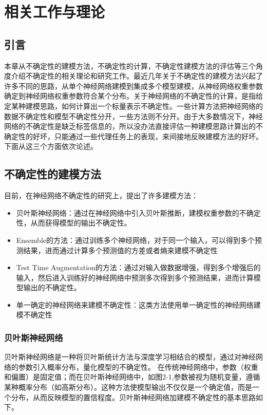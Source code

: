 \chapter{相关工作与理论}
\section{引言}
本章从不确定性的建模方法，不确定性的计算，不确定性建模方法的评估等三个角度介绍不确定性的相关理论和研究工作。最近几年关于不确定性的建模方法兴起了许多不同的思路，从单个神经网络建模到集成多个模型建模，从神经网络权重参数确定到神经网络权重参数符合某个分布。关于神经网络的不确定性的计算，是指给定某种建模思路，如何计算出一个标量表示不确定性。一些计算方法把神经网络的数据不确定性和模型不确定性分开，一些方法则不分开。由于大多数情况下，神经网络的不确定性是缺乏标签信息的，所以没办法直接评估一种建模思路计算出的不确定性的好坏，只能通过一些代理任务上的表现，来间接地反映建模方法的好坏。下面从这三个方面依次论述。

\section{不确定性的建模方法}
目前，在神经网络不确定性的研究上，提出了许多建模方法：
\begin{itemize}
    \item 贝叶斯神经网络：通过在神经网络中引入贝叶斯推断，建模权重参数的不确定性，从而获得模型的输出不确定性。
    \item Ensemble的方法：通过训练多个神经网络，对于同一个输入，可以得到多个预测结果，进而通过计算多个预测值的方差或者熵来建模不确定性
    \item Test Time Augmentation的方法：通过对输入做数据增强，得到多个增强后的输入，然后进入训练好的神经网络中预测多次得到多个预测结果，进而计算模型输出的不确定性。
    \item 单一确定的神经网络来建模不确定性：这类方法使用单一确定性的神经网络建模不确定性
\end{itemize}

\subsection{贝叶斯神经网络}
贝叶斯神经网络是一种将贝叶斯统计方法与深度学习相结合的模型，通过对神经网络的参数引入概率分布，量化模型的不确定性。 在传统神经网络中，参数（权重和偏置）是固定值；而在贝叶斯神经网络中，如图2-1,参数被视为随机变量，遵循某种概率分布（如高斯分布）。这种方法使模型输出不仅仅是一个确定值，而是一个分布，从而反映模型的置信程度。贝叶斯神经网络加建模不确定性的基本思路如下。

